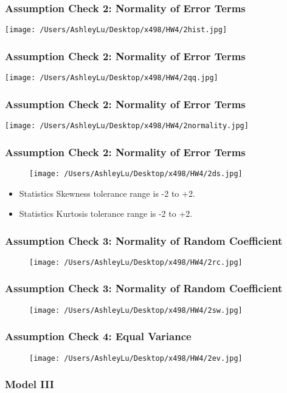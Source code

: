 \documentclass{beamer}
\begin{document}
\frame
{
\frametitle{Assumption Check 2: Normality of Error Terms}
\begin{center}
\texttt{[image: /Users/AshleyLu/Desktop/x498/HW4/2hist.jpg]}	
\end{center}

}
\frame
{
\frametitle{Assumption Check 2: Normality of Error Terms}
\begin{center}
\texttt{[image: /Users/AshleyLu/Desktop/x498/HW4/2qq.jpg]}	
\end{center}

}
\frame
{
\frametitle{Assumption Check 2: Normality of Error Terms}
\begin{center}
\centering
\texttt{[image: /Users/AshleyLu/Desktop/x498/HW4/2normality.jpg]}	
\end{center}

}
\frame
{
\frametitle{Assumption Check 2: Normality of Error Terms}
\begin{figure}
\hspace*{-0.5cm}\texttt{[image: /Users/AshleyLu/Desktop/x498/HW4/2ds.jpg]}	
\end{figure}
\begin{itemize}
\item Statistics Skewness tolerance range is -2 to +2.
\item Statistics Kurtosis  tolerance range is -2 to +2.
\end{itemize}
}

\frame
{
\frametitle{Assumption Check 3: Normality of Random Coefficient}
\begin{figure}
\vspace*{-0.5cm}\texttt{[image: /Users/AshleyLu/Desktop/x498/HW4/2rc.jpg]}	
\end{figure}

}
\frame
{
\frametitle{Assumption Check 3: Normality of Random Coefficient}
\begin{figure}
\texttt{[image: /Users/AshleyLu/Desktop/x498/HW4/2sw.jpg]}	

\end{figure}

}
\frame
{
\frametitle{Assumption Check 4: Equal Variance}
\begin{figure}
\hspace*{-0.5cm}\texttt{[image: /Users/AshleyLu/Desktop/x498/HW4/2ev.jpg]}	
\end{figure}
}

\frame
{
\frametitle{Model III}

}
\end{document}
